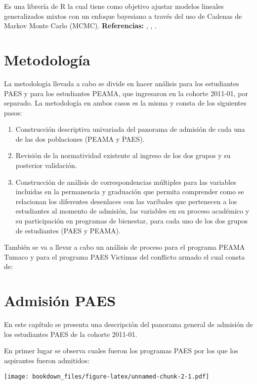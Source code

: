 \documentclass[]{article}
\providecommand{\tightlist}{%
  \setlength{\itemsep}{0pt}\setlength{\parskip}{0pt}}
\theoremstyle{definition}
\theoremstyle{definition}
\theoremstyle{definition}
\theoremstyle{remark}
\begin{document}
Es una librería de R la cual tiene como objetivo ajustar modelos
lineales generalizados mixtos con un enfoque bayesiano a través del uso
de Cadenas de Markov Monte Carlo (MCMC). \textbf{Referencias:}
\citep{MCMCglmm}, \citep{HadfieldBook}, \citep{HadfieldCourseNotes}.

\section{Metodología}\label{metodologuxeda}

La metodología llevada a cabo se divide en hacer análisis para los
estudiantes PAES y para los estudiantes PEAMA, que ingresaron en la
cohorte 2011-01, por separado. La metodología en ambos casos es la misma
y consta de los siguientes pasos:

\begin{enumerate}
\def\labelenumi{\arabic{enumi}.}
\tightlist
\item
  Construcción descriptiva univariada del panorama de admisión de cada
  una de las dos poblaciones (PEAMA y PAES).
\item
  Revisión de la normatividad existente al ingreso de los dos grupos y
  su posterior validación.
\item
  Construcción de análisis de correspondencias múltiples para las
  variables incluidas en la permanencia y graduación que permita
  comprender como se relacionan los diferentes desenlaces con las
  varibales que pertenecen a los estudiantes al momento de admisión, las
  variables en su proceso académico y su participación en programas de
  bienestar, para cada uno de los dos grupos de estudiantes (PAES y
  PEAMA).
\end{enumerate}

También se va a llevar a cabo un análisis de proceso para el programa
PEAMA Tumaco y para el programa PAES Victimas del conflicto armado el
cual consta de:

\section{Admisión PAES}\label{admision-paes}

En este capítulo se presenta una descripción del panorama general de
admisión de los estudiantes PAES de la cohorte 2011-01.

En primer lugar se observa cuales fueron los programas PAES por los que
los aspirantes fueron admitidos:

\texttt{[image: bookdown\_files/figure-latex/unnamed-chunk-2-1.pdf]}
\end{document}
